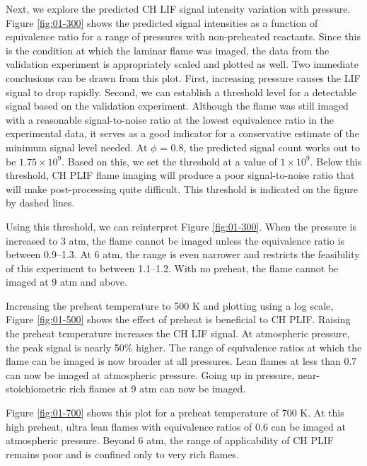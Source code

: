 Next, we explore the predicted CH LIF signal intensity variation with pressure.
Figure \ref{fig:01-300} shows the predicted signal intensities as a function of equivalence ratio for a range of pressures with non-preheated reactants.
Since this is the condition at which the laminar flame was imaged, the data from the validation experiment is appropriately scaled and plotted as well.
Two immediate conclusions can be drawn from this plot.
First, increasing pressure causes the LIF signal to drop rapidly.
Second, we can establish a threshold level for a detectable signal based on the validation experiment.
Although the flame was still imaged with a reasonable signal-to-noise ratio at the lowest equivalence ratio in the experimental data, it serves as a good indicator for a conservative estimate of the minimum signal level needed.
At \(\phi\) = 0.8, the predicted signal count works out to be \(1.75\times10^9\).
Based on this, we set the threshold at a value of \(1\times10^9\).
Below this threshold, CH PLIF flame imaging will produce a poor signal-to-noise ratio that will make post-processing quite difficult.
This threshold is indicated on the figure by dashed lines.

Using this threshold, we can reinterpret Figure \ref{fig:01-300}.
When the pressure is increased to 3 atm, the flame cannot be imaged unless the equivalence ratio is between 0.9--1.3.
At 6 atm, the range is even narrower and restricts the feasibility of this experiment to between 1.1--1.2.
With no preheat, the flame cannot be imaged at 9 atm and above.



Increasing the preheat temperature to 500 K and plotting using a log scale, Figure \ref{fig:01-500} shows the effect of preheat is beneficial to CH PLIF.
Raising the preheat temperature increases the CH LIF signal.
At atmospheric pressure, the peak signal is nearly 50\% higher.
The range of equivalence ratios at which the flame can be imaged is now broader at all pressures.
Lean flames at less than 0.7 can now be imaged at atmospheric pressure.
Going up in pressure, near-stoichiometric rich flames at 9 atm can now be imaged.



Figure \ref{fig:01-700} shows this plot for a preheat temperature of 700 K.
At this high preheat, ultra lean flames with equivalence ratios of 0.6 can be imaged at atmospheric pressure.
Beyond 6 atm, the range of applicability of CH PLIF remains poor and is confined only to very rich flames.

